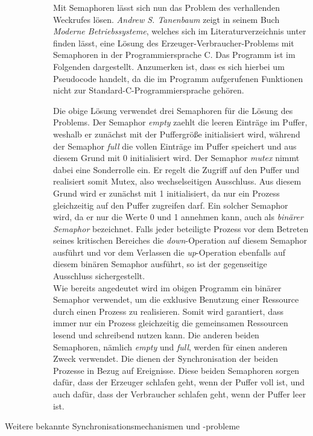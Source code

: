 \begin{description}
\begin{description}
								Mit Semaphoren lässt sich nun das Problem des verhallenden Weckrufes lösen. \textit{Andrew S. Tanenbaum} zeigt in seinem Buch \textit{Moderne Betriebssysteme}, welches sich im Literaturverzeichnis unter \cite{ModerneBetriebssysteme} finden lässt, eine Lösung des Erzeuger-Verbraucher-Problems mit Semaphoren in der Programmiersprache C. Das Programm ist im Folgenden dargestellt. Anzumerken ist, dass es sich hierbei um Pseudocode handelt, da die im Programm aufgerufenen Funktionen nicht zur Standard-C-Programmiersprache gehören.
								
								
								
								Die obige Lösung verwendet drei Semaphoren für die Lösung des Problems. Der Semaphor \textit{empty} zaehlt die leeren Einträge im Puffer, weshalb er zunächst mit der Puffergröße initialisiert wird, während der Semaphor \textit{full} die vollen Einträge im Puffer speichert und aus diesem Grund mit 0 initialisiert wird. Der Semaphor \textit{mutex} nimmt dabei eine Sonderrolle ein. Er regelt die Zugriff auf den Puffer und realisiert somit Mutex, also wechselseitigen Ausschluss. Aus diesem Grund wird er zunächst mit 1 initialisiert, da nur ein Prozess gleichzeitig auf den Puffer zugreifen darf. Ein solcher Semaphor wird, da er nur die Werte 0 und 1 annehmen kann, auch als \textit{binärer Semaphor} bezeichnet. Falls jeder beteiligte Prozess vor dem Betreten seines kritischen Bereiches die \textit{down}-Operation auf diesem Semaphor ausführt und vor dem Verlassen die \textit{up}-Operation ebenfalls auf diesem binären Semaphor ausführt, so ist der gegenseitige Ausschluss sichergestellt.\\
								Wie bereits angedeutet wird im obigen Programm ein binärer Semaphor verwendet, um die exklusive Benutzung einer Ressource durch einen Prozess zu realisieren. Somit wird garantiert, dass immer nur ein Prozess gleichzeitig die gemeinsamen Ressourcen lesend und schreibend nutzen kann. Die anderen beiden Semaphoren, nämlich \textit{empty} und \textit{full}, werden für einen anderen Zweck verwendet. Die dienen der Synchronisation der beiden Prozesse in Bezug auf Ereignisse. Diese beiden Semaphoren sorgen dafür, dass der Erzeuger schlafen geht, wenn der Puffer voll ist, und auch dafür, dass der Verbraucher schlafen geht, wenn der Puffer leer ist.
						\end{description}
					
					\item[Weitere bekannte Synchronisationsmechanismen und -probleme]
					

\end{description}
